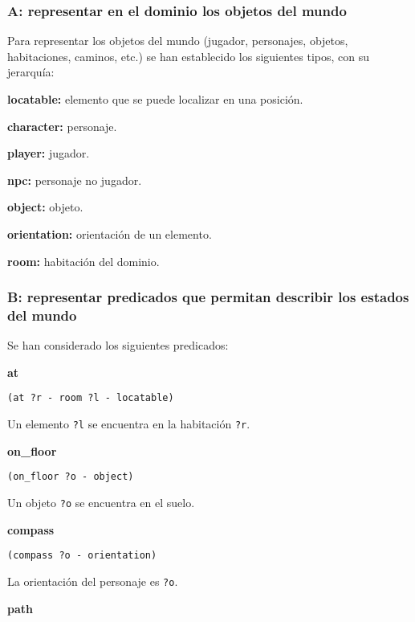 \documentclass[11pt,a4paper]{article}
\begin{document}
\subsubsection{A: representar en el dominio los objetos del mundo}

Para representar los objetos del mundo (jugador, personajes, objetos, habitaciones, caminos, etc.) se han establecido
los siguientes tipos, con su jerarquía:

\medskip

\textbf{locatable:} elemento que se puede localizar en una posición.
	
\quad \textbf{character:} personaje.

\quad \quad	\textbf{player:} jugador.

\quad \quad \textbf{npc:} personaje no jugador.

\quad \textbf{object:} objeto.

\textbf{orientation:} orientación de un elemento.

\textbf{room:} habitación del dominio.

\subsubsection{B: representar predicados que permitan describir los estados del mundo}

Se han considerado los siguientes predicados:

\medskip

\large{\textbf{at}}

\texttt{(at ?r - room ?l - locatable)}

\smallskip

Un elemento \texttt{?l} se encuentra en la habitación \texttt{?r}. 

\medskip

\large{\textbf{on\_floor}}

\texttt{(on\_floor ?o - object)}

\smallskip

Un objeto \texttt{?o} se encuentra en el suelo. 

\medskip

\large{\textbf{compass}}

\texttt{(compass ?o - orientation)}

\smallskip

La orientación del personaje es \texttt{?o}.

\medskip

\large{\textbf{path}}
\end{document}
